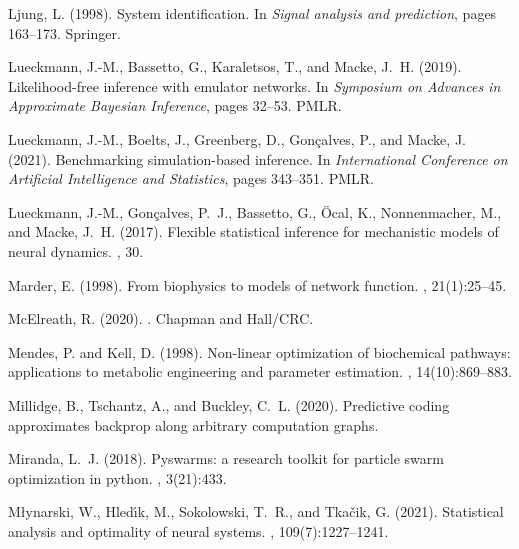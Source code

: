 \documentclass[12pt]{article}
\begin{document}
\begin{thebibliography}{}
Ljung, L. (1998).
\newblock System identification.
\newblock In {\em Signal analysis and prediction}, pages 163--173. Springer.

Lueckmann, J.-M., Bassetto, G., Karaletsos, T., and Macke, J.~H. (2019).
\newblock Likelihood-free inference with emulator networks.
\newblock In {\em Symposium on Advances in Approximate Bayesian Inference},
  pages 32--53. PMLR.

Lueckmann, J.-M., Boelts, J., Greenberg, D., Gon{\c{c}}alves, P., and Macke, J.
  (2021).
\newblock Benchmarking simulation-based inference.
\newblock In {\em International Conference on Artificial Intelligence and
  Statistics}, pages 343--351. PMLR.

Lueckmann, J.-M., Gon{\c{c}}alves, P.~J., Bassetto, G., {\"O}cal, K.,
  Nonnenmacher, M., and Macke, J.~H. (2017).
\newblock Flexible statistical inference for mechanistic models of neural
  dynamics.
, 30.

Marder, E. (1998).
\newblock From biophysics to models of network function.
, 21(1):25--45.

McElreath, R. (2020).
.
\newblock Chapman and Hall/CRC.

Mendes, P. and Kell, D. (1998).
\newblock Non-linear optimization of biochemical pathways: applications to
  metabolic engineering and parameter estimation.
, 14(10):869--883.

Millidge, B., Tschantz, A., and Buckley, C.~L. (2020).
\newblock Predictive coding approximates backprop along arbitrary computation
  graphs.

Miranda, L.~J. (2018).
\newblock Pyswarms: a research toolkit for particle swarm optimization in
  python.
, 3(21):433.

M{\l}ynarski, W., Hled{\'\i}k, M., Sokolowski, T.~R., and Tka{\v{c}}ik, G.
  (2021).
\newblock Statistical analysis and optimality of neural systems.
, 109(7):1227--1241.


\end{thebibliography}
\end{document}
